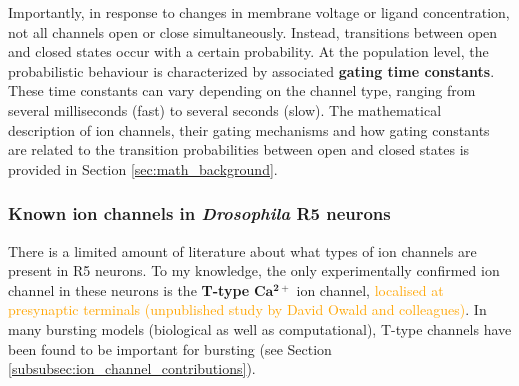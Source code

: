 \documentclass[../main.tex]{subfiles}
\begin{document}
Importantly, in response to changes in membrane voltage or ligand concentration, not all channels open or close simultaneously. Instead, transitions between open and closed states occur with a certain probability. At the population level, the probabilistic behaviour is characterized by associated \textbf{gating time constants}. These time constants can vary depending on the channel type, ranging from several milliseconds (fast) to several seconds (slow). The mathematical description of ion channels, their gating mechanisms and how gating constants are related
to the transition probabilities between open and closed states is provided in Section \ref{sec:math_background}.





\subsubsection{Known ion channels in \textit{Drosophila} R5 neurons} \label{subsubsect:known_channels_in_r5}
There is a limited amount of literature about what types of ion channels are present in R5 neurons. To my knowledge, the only experimentally confirmed ion channel in these neurons is the \textbf{T-type} \( \mathbf{Ca^{2+}} \) ion channel, \textcolor{orange}{localised at presynaptic terminals (unpublished study by David Owald and colleagues)}. In many bursting models (biological as well as computational), T-type channels have been found to be important for bursting (see Section \ref{subsubsec:ion_channel_contributions}).
\end{document}

